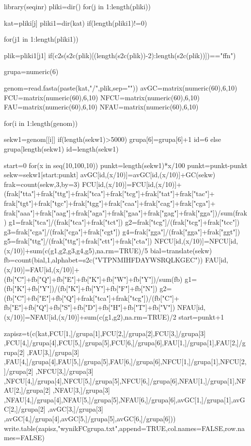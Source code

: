 library(seqinr)
pliki=dir()
for(j in 1:length(pliki))
{
kat=pliki[j]
pliki1=dir(kat)
if(length(pliki1)!=0)
{
for(j1 in 1:length(pliki1))
{
plik=pliki1[j1]
if(c2s(s2c(plik)[(length(s2c(plik))-2):length(s2c(plik))])=="ffn")
{
grupa=numeric(6)

genom=read.fasta(paste(kat,"/",plik,sep=""))
avGC=matrix(numeric(60),6,10)
FCU=matrix(numeric(60),6,10)
NFCU=matrix(numeric(60),6,10)
FAU=matrix(numeric(60),6,10)
NFAU=matrix(numeric(60),6,10)

for(i in 1:length(genom))
{
sekw1=genom[[i]]
if(length(sekw1)>5000)
{
grupa[6]=grupa[6]+1
id=6
}
else
{
grupa[length(sekw1)%
id=length(sekw1)%
}

start=0
for(x in seq(10,100,10))
{
punkt=length(sekw1)*x/100
punkt=punkt-punkt%
sekw=sekw1[start:punkt]
avGC[id,(x/10)]=avGC[id,(x/10)]+GC(sekw)
frak=count(sekw,3,by=3)
FCU[id,(x/10)]=FCU[id,(x/10)]+(frak["tta"]+frak["ttg"]+frak["tca"]+frak["tcg"]+frak["tat"]+frak["tac"]+
frak["tgt"]+frak["tgc"]+frak["tgg"]+frak["caa"]+frak["cag"]+frak["cga"]+
frak["aaa"]+frak["aag"]+frak["aga"]+frak["gaa"]+frak["gag"]+frak["gga"])/sum(frak)
g1=frak["tca"]/(frak["tca"]+frak["tct"])
g2=frak["tcg"]/(frak["tcg"]+frak["tcc"])
g3=frak["cga"]/(frak["cga"]+frak["cgt"])
g4=frak["gga"]/(frak["gga"]+frak["ggt"])
g5=frak["ttg"]/(frak["ttg"]+frak["ctt"]+frak["cta"])
NFCU[id,(x/10)]=NFCU[id,(x/10)]+sum(c(g1,g2,g3,g4,g5),na.rm=TRUE)/5
bial=translate(sekw)
fb=count(bial,1,alphabet=s2c("VTPNMIHFDAYWSRQLKGEC"))
FAU[id,(x/10)]=FAU[id,(x/10)]+(fb["C"]+fb["Q"]+fb["E"]+fb["K"]+fb["W"]+fb["Y"])/sum(fb)
g1=(fb["K"]+fb["Y"])/(fb["K"]+fb["Y"]+fb["F"]+fb["N"])
g2=(fb["C"]+fb["E"]+fb["Q"]+frak["tca"]+frak["tcg"])/(fb["C"]+
 fb["E"]+fb["Q"]+fb["S"]+fb["D"]+fb["H"]+fb["T"]+fb["V"])
NFAU[id,(x/10)]=NFAU[id,(x/10)]+sum(c(g1,g2),na.rm=TRUE)/2
start=punkt+1
}
}
zapisz=t(c(kat,FCU[1,]/grupa[1],FCU[2,]/grupa[2],FCU[3,]/grupa[3]
,FCU[4,]/grupa[4],FCU[5,]/grupa[5],FCU[6,]/grupa[6],FAU[1,]/grupa[1],FAU[2,]/grupa[2]
,FAU[3,]/grupa[3]
,FAU[4,]/grupa[4],FAU[5,]/grupa[5],FAU[6,]/grupa[6],NFCU[1,]/grupa[1],NFCU[2,]/grupa[2]
,NFCU[3,]/grupa[3]
,NFCU[4,]/grupa[4],NFCU[5,]/grupa[5],NFCU[6,]/grupa[6],NFAU[1,]/grupa[1],NFAU[2,]/grupa[2]
,NFAU[3,]/grupa[3]
,NFAU[4,]/grupa[4],NFAU[5,]/grupa[5],NFAU[6,]/grupa[6],avGC[1,]/grupa[1],avGC[2,]/grupa[2]
,avGC[3,]/grupa[3]
,avGC[4,]/grupa[4],avGC[5,]/grupa[5],avGC[6,]/grupa[6]))
write.table(zapisz,"wynikFCgrupa.txt",append=TRUE,col.names=FALSE,row.names=FALSE)
}
}
}
}

